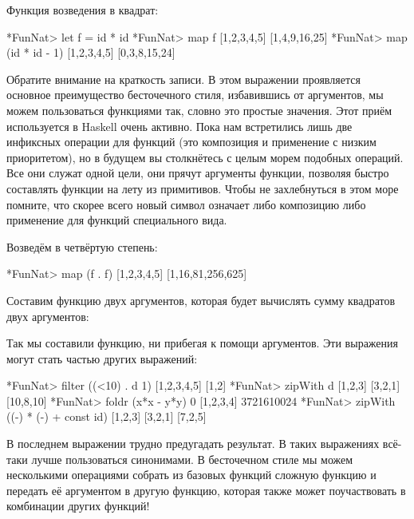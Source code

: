 Функция возведения в квадрат:

\begin{code}
*FunNat> let f = id * id
*FunNat> map f [1,2,3,4,5]
[1,4,9,16,25]
*FunNat> map (id * id - 1) [1,2,3,4,5]
[0,3,8,15,24]
\end{code}

Обратите внимание на краткость записи. В этом выражении
\mbox{} проявляется основное преимущество 
бесточечного стиля, избавившись от аргументов, мы можем
пользоваться функциями так, словно это простые значения. 
Этот приём используется в Haskell очень активно. Пока
нам встретились лишь две инфиксных операции для функций 
(это композиция и применение с низким приоритетом),
но в будущем вы столкнётесь с целым морем подобных операций.
Все они служат одной цели, они прячут аргументы функции, 
позволяя быстро составлять функции на лету из примитивов. 
Чтобы не захлебнуться в этом море помните, что скорее
всего новый символ означает либо композицию либо 
применение для функций специального вида. 

Возведём в четвёртую степень:

\begin{code}
*FunNat> map (f . f) [1,2,3,4,5]
[1,16,81,256,625]
\end{code}

Составим функцию двух аргументов, которая будет
вычислять сумму квадратов двух аргументов:


Так мы составили функцию, ни прибегая к помощи аргументов.
Эти выражения могут стать частью других выражений:

\begin{code}
*FunNat> filter  ((<10) . d 1) [1,2,3,4,5]
[1,2]
*FunNat> zipWith d [1,2,3] [3,2,1]
[10,8,10]
*FunNat> foldr (x*x - y*y) 0 [1,2,3,4]
3721610024
*FunNat> zipWith ((-) * (-) + const id) [1,2,3] [3,2,1]
[7,2,5]
\end{code}

В последнем выражении трудно предугадать результат. В таких
выражениях всё-таки лучше пользоваться синонимами.
В бесточечном стиле мы можем 
несколькими операциями собрать из базовых функций
сложную функцию и передать её аргументом в другую функцию,
которая также может поучаствовать в комбинации других
функций!

